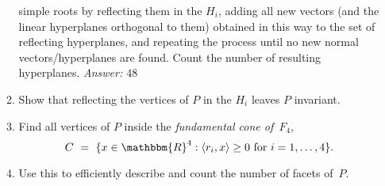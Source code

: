 \documentclass[11pt]{amsart}
\newcommand{\RR}{\mathbbm{R}}
\begin{document}
\begin{enumerate}
\begin{enumerate}
        simple roots by reflecting them in the $H_i$, adding all
        new vectors (and the linear hyperplanes orthogonal to them)
        obtained in this way to the set of reflecting hyperplanes, and
        repeating the process until no new normal vectors/hyperplanes
        are found. Count the number of resulting
        hyperplanes. \emph{Answer: $48$}
      \item Show that reflecting the vertices of $P$ in the $H_i$ leaves $P$ invariant.
      \item Find all vertices of $P$ inside the \emph{fundamental cone of~$F_4$},
        \[
          C
          \ = \
          \{x\in\RR^4:\langle r_i,x\rangle\ge0\text{ for }i=1,\dots,4\}.
          \]
      \item Use this to efficiently describe and count the number of facets of~$P$.
      \end{enumerate}
\end{enumerate}
\end{document}
